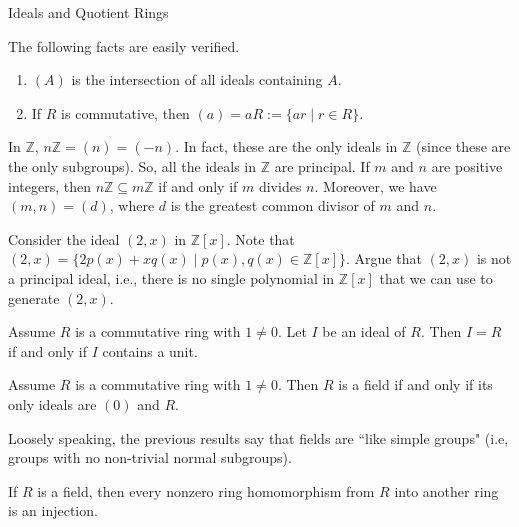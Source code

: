 \begin{section}{Ideals and Quotient Rings}
\begin{remark}
The following facts are easily verified.
\begin{enumerate}[label=\rm{(\alph*)}]
\item $(A)$ is the intersection of all ideals containing $A$.
\item If $R$ is commutative, then $(a)=aR:=\{ar\mid r\in R\}$.
\end{enumerate}
\end{remark}

\begin{example}\label{ex:PrincipalIdeals}
In $\mathbb{Z}$, $n\mathbb{Z}=(n)=(-n)$.  In fact, these are the only ideals in $\mathbb{Z}$ (since these are the only subgroups). So, all the ideals in $\mathbb{Z}$ are principal. If $m$ and $n$ are positive integers, then $n\mathbb{Z}\subseteq m\mathbb{Z}$ if and only if $m$ divides $n$.  Moreover, we have $(m,n)=(d)$, where $d$ is the greatest common divisor of $m$ and $n$.
\end{example}

\begin{problem}
Consider the ideal $(2,x)$ in $\mathbb{Z}[x]$. Note that $(2,x)=\{2p(x)+xq(x)\mid p(x),q(x)\in\mathbb{Z}[x]\}$.  Argue that $(2,x)$ is not a principal ideal, i.e., there is no single polynomial in $\mathbb{Z}[x]$ that we can use to generate $(2,x)$.
\end{problem}

\begin{theorem}
Assume $R$ is a commutative ring with $1\neq 0$. Let $I$ be an ideal of $R$. Then $I=R$ if and only if $I$ contains a unit.
\end{theorem}

\begin{theorem}
Assume $R$ is a commutative ring with $1\neq 0$.  Then $R$ is a field if and only if its only ideals are $(0)$ and $R$.
\end{theorem}

Loosely speaking, the previous results say that fields are ``like simple groups" (i.e, groups with no non-trivial normal subgroups).

\begin{corollary}\label{cor:HomFromField}
If $R$ is a field, then every nonzero ring homomorphism from $R$ into another ring is an injection.
\end{corollary}

\end{section}

